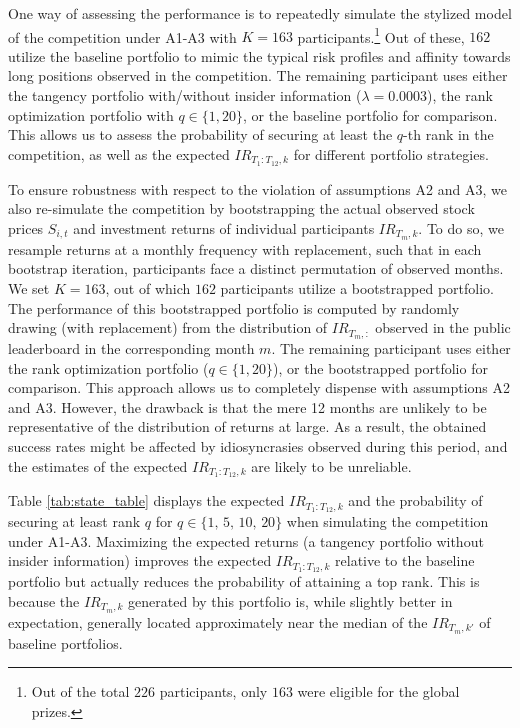 \documentclass[3p,times,twocolumn]{elsarticle}
\begin{document}
One way of assessing the performance is to repeatedly simulate the stylized model of the competition under A1-A3 with $K=163$ participants.\footnote{
    Out of the total $226$ participants, only $163$ were eligible for the global prizes.
}
Out of these, $162$ utilize the baseline portfolio to mimic the typical risk profiles and affinity towards long positions observed in the competition.
The remaining participant uses either the tangency portfolio with/without insider information ($\lambda = 0.0003$), the rank optimization portfolio with $q\in \{1,20\}$, or the baseline portfolio for comparison.
This allows us to assess the probability of securing at least the $q$-th rank in the competition, as well as the expected $IR_{T_{1}:T_{12},k}$ for different portfolio strategies.

To ensure robustness with respect to the violation of assumptions A2 and A3, we also re-simulate the competition by bootstrapping the actual observed stock prices $S_{i,t}$ and investment returns of individual participants $IR_{T_{m},k}$.
To do so, we resample returns at a monthly frequency with replacement, such that in each bootstrap iteration, participants face a distinct permutation of observed months.
We set $K=163$, out of which $162$ participants utilize a bootstrapped portfolio.
The performance of this bootstrapped portfolio is computed by randomly drawing (with replacement) from the distribution of $IR_{T_{m},:}$ observed in the public leaderboard in the corresponding month $m$.
The remaining participant uses either the rank optimization portfolio ($q\in\{1,20\}$), or the bootstrapped portfolio for comparison.
This approach allows us to completely dispense with assumptions A2 and A3.
However, the drawback is that the mere 12 months are unlikely to be representative of the distribution of returns at large.
As a result, the obtained success rates might be affected by idiosyncrasies observed during this period, and the estimates of the expected $IR_{T_{1}:T_{12},k}$ are likely to be unreliable.

Table \ref{tab:state_table} displays the expected $IR_{T_{1}:T_{12},k}$ and the probability of securing at least rank $q$ for $q\in \{ 1,\,5,\,10,\,20\}$ when simulating the competition under A1-A3.
Maximizing the expected returns (a tangency portfolio without insider information) improves the expected $IR_{T_{1}:T_{12},k}$ relative to the baseline portfolio but actually reduces the probability of attaining a top rank.
This is because the $IR_{T_{m},k}$ generated by this portfolio is, while slightly better in expectation, generally located approximately near the median of the $IR_{T_{m},k'}$ of baseline portfolios.
\end{document}
